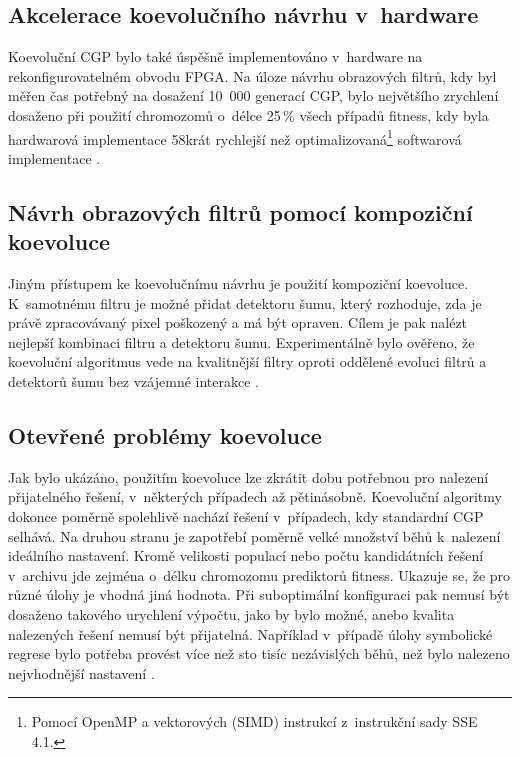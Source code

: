 \subsection{Akcelerace koevolučního návrhu v~hardware}

Koevoluční CGP bylo také úspěšně implementováno v~hardware na rekonfigurovatelném obvodu FPGA. Na úloze návrhu obrazových filtrů, kdy byl měřen čas potřebný na dosažení 10~000 generací CGP, bylo největšího zrychlení dosaženo při použití chromozomů o~délce 25\,\% všech případů fitness, kdy byla hardwarová implementace 58krát rychlejší než optimalizovaná\footnote{Pomocí OpenMP a vektorových (SIMD) instrukcí z~instrukční sady SSE 4.1.} softwarová implementace \cite{Hrbacek}.

\subsection{Návrh obrazových filtrů pomocí kompoziční koevoluce}

Jiným přístupem ke koevolučnímu návrhu je použití kompoziční koevoluce. K~samotnému filtru je možné přidat detektoru šumu, který rozhoduje, zda je právě zpracovávaný pixel poškozený a má být opraven. Cílem je pak nalézt nejlepší kombinaci filtru a detektoru šumu. Experimentálně bylo ověřeno, že koevoluční algoritmus vede na kvalitnější filtry oproti oddělené evoluci filtrů a detektorů šumu bez vzájemné interakce \cite{SikuKomjathy}.

\subsection{Otevřené problémy koevoluce}
\label{secProblems}

Jak bylo ukázáno, použitím koevoluce lze zkrátit dobu potřebnou pro nalezení přijatelného řešení, v~některých případech až pětinásobně. Koevoluční algoritmy dokonce poměrně spolehlivě nachází řešení v~případech, kdy standardní CGP selhává. Na druhou stranu je zapotřebí poměrně velké množství běhů k~nalezení ideálního nastavení. Kromě velikosti populací nebo počtu kandidátních řešení v~archivu jde zejména o~délku chromozomu prediktorů fitness. Ukazuje se, že pro různé úlohy je vhodná jiná hodnota. Při suboptimální konfiguraci pak nemusí být dosaženo takového urychlení výpočtu, jako by bylo možné, anebo kvalita nalezených řešení nemusí být přijatelná. Například v~případě úlohy symbolické regrese bylo potřeba provést více než sto tisíc nezávislých běhů, než bylo nalezeno nejvhodnější nastavení \cite{SikuEuroGP}.

